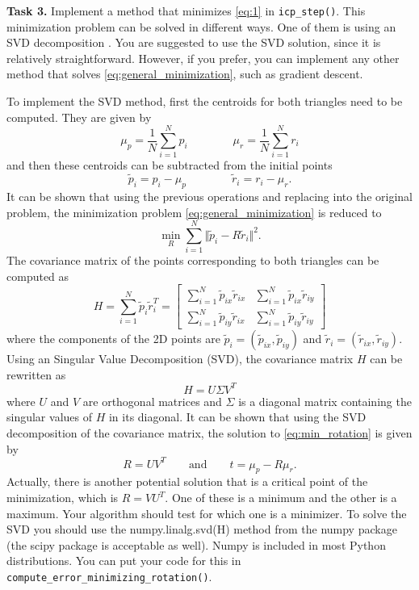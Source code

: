 \documentclass[a4paper,11pt]{article}
\begin{document}
{\bf Task 3.}   Implement a method that minimizes \eqref{eq:1} in \texttt{icp\_step()}.
This minimization problem can be solved in different ways. One of them is using an SVD
decomposition \cite{Arun87}.   You are suggested to use the SVD solution,
since it is relatively straightforward. However, if you prefer, you can
implement any other method that solves \eqref{eq:general_minimization}, such
as gradient descent.

To implement the SVD method, first the centroids for both triangles need to be computed. They are given by
\begin{equation*}
  \mu_p = \frac{1}{N}\sum_{i=1}^{N} p_i \qquad \qquad \mu_r =
  \frac{1}{N}\sum_{i=1}^{N} r_i
\end{equation*}
and then these centroids can be subtracted from the initial points
\begin{equation*}
  \tilde{p}_i = p_i - \mu_p \qquad \qquad \tilde{r}_i = r_i - \mu_r.
\end{equation*}
It can be shown \cite{Arun87} that using the previous operations and replacing
into the original problem, the minimization problem
\eqref{eq:general_minimization} is reduced to
\begin{equation}
  \label{eq:min_rotation}
  \min_{R} \sum_{i=1}^N \Vert \tilde{p}_i - R\tilde{r}_i \Vert^2.
\end{equation}
The covariance matrix of the points corresponding to both triangles can be
computed as
\begin{equation*}
  H = \sum_{i=1}^{N} \tilde{p}_i\tilde{r}_i^T = 
  \begin{bmatrix}
    \sum_{i=1}^{N} \tilde{p}_{ix}\tilde{r}_{ix} &
    \sum_{i=1}^{N} \tilde{p}_{ix}\tilde{r}_{iy} \\
    \sum_{i=1}^{N} \tilde{p}_{iy}\tilde{r}_{ix} &
    \sum_{i=1}^{N} \tilde{p}_{iy}\tilde{r}_{iy} 
  \end{bmatrix}
\end{equation*}
where the components of the 2D points are
$\tilde{p}_i = (\tilde{p}_{ix}, \tilde{p}_{iy})$ and
$\tilde{r}_i = (\tilde{r}_{ix}, \tilde{r}_{iy})$. Using an Singular Value
Decomposition (SVD), the covariance matrix $H$ can be rewritten as
\begin{equation*}
  H = U \Sigma V^T
\end{equation*}
where $U$ and $V$ are orthogonal matrices and $\Sigma$ is a diagonal matrix
containing the singular values of $H$ in its diagonal. It can be shown
\cite{Arun87} that using the SVD decomposition of the covariance matrix, the
solution to \eqref{eq:min_rotation} is given by
\begin{equation}
  \label{eq:4}
  R = UV^T \qquad  \text{and} \qquad    t = \mu_p - R \mu_r.
\end{equation}
Actually, there is another potential solution that is a critical point of the
minimization, which is $R=VU^T$.  One of these is a minimum and the other is a
maximum.  Your algorithm should test for which one is a minimizer.
To solve the SVD you should use the numpy.linalg.svd(H) method from the numpy
package (the scipy package is acceptable as well). Numpy is
included in most Python distributions.  You can put your code for this in
\texttt{compute\_error\_minimizing\_rotation()}.
\end{document}
